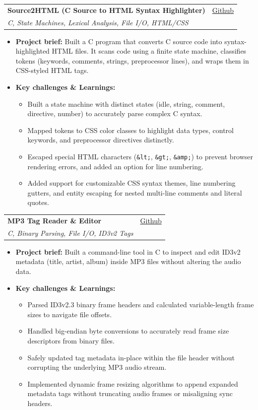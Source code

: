 \documentclass[letterpaper,11pt]{article}
\makeatletter
\newcommand{\resumeItem}[1]{
  \item
    {#1 \vspace{-2pt}}
}
\newcommand{\resumeSubheading}[4]{
  \vspace{-2pt}\item
    \begin{tabular*}{0.97\textwidth}[t]{l@{\extracolsep{\fill}}r}
      \textbf{#1} & #2 \\
      \textit{#3} & {#4} \\
    \end{tabular*}\vspace{-7pt}
}
\newcommand{\resumeItemListStart}{\begin{itemize}[topsep=2pt, itemsep=2pt, parsep=0pt]}
\newcommand{\resumeItemListEnd}{\end{itemize}\vspace{-5pt}}
\makeatother
\begin{document}
    \resumeSubheading
      {Source2HTML (C Source to HTML Syntax Highlighter)}{\href{https://github.com/k0-R0/Source-2-HTML}{Github}}
      {C, State Machines, Lexical Analysis, File I/O, HTML/CSS}{}
      \resumeItemListStart
        \resumeItem{\textbf{Project brief:} Built a C program that converts C source code into syntax-highlighted HTML files. It scans code using a finite state machine, classifies tokens (keywords, comments, strings, preprocessor lines), and wraps them in CSS-styled HTML tags.}
        \resumeItem{\textbf{Key challenges \& Learnings:}}
        \resumeItemListStart
            \resumeItem{Built a state machine with distinct states (idle, string, comment, directive, number) to accurately parse complex C syntax.}
            \resumeItem{Mapped tokens to CSS color classes to highlight data types, control keywords, and preprocessor directives distinctly.}
            \resumeItem{Escaped special HTML characters (\texttt{\&lt;}, \texttt{\&gt;}, \texttt{\&amp;}) to prevent browser rendering errors, and added an option for line numbering.}
            \resumeItem{Added support for customizable CSS syntax themes, line numbering gutters, and entity escaping for nested multi-line comments and literal quotes.}
        \resumeItemListEnd
      \resumeItemListEnd

    \resumeSubheading
      {MP3 Tag Reader \& Editor}{\href{https://github.com/k0-R0/MP3_TagReader}{Github}}
      {C, Binary Parsing, File I/O, ID3v2 Tags}{}
      \resumeItemListStart
        \resumeItem{\textbf{Project brief:} Built a command-line tool in C to inspect and edit ID3v2 metadata (title, artist, album) inside MP3 files without altering the audio data.}
        \resumeItem{\textbf{Key challenges \& Learnings:}}
        \resumeItemListStart
            \resumeItem{Parsed ID3v2.3 binary frame headers and calculated variable-length frame sizes to navigate file offsets.}
            \resumeItem{Handled big-endian byte conversions to accurately read frame size descriptors from binary files.}
            \resumeItem{Safely updated tag metadata in-place within the file header without corrupting the underlying MP3 audio stream.}
            \resumeItem{Implemented dynamic frame resizing algorithms to append expanded metadata tags without truncating audio frames or misaligning sync headers.}
        \resumeItemListEnd
      \resumeItemListEnd

  \newpage
\end{document}
